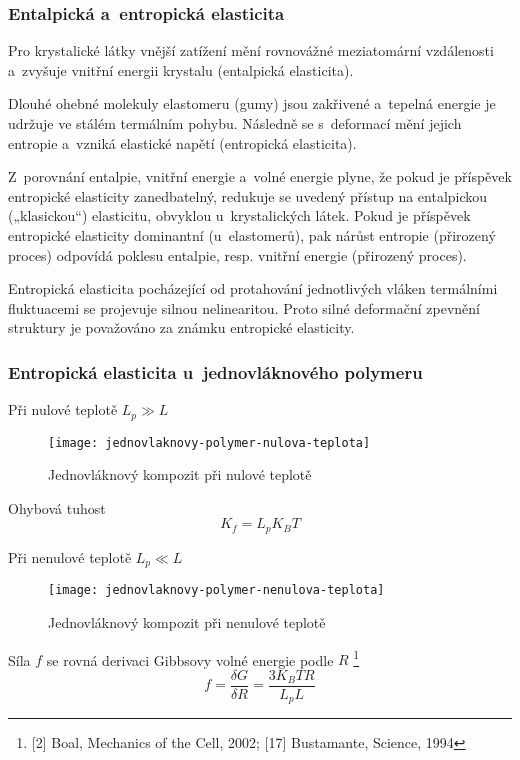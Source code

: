 \subsubsection{Entalpická a~entropická elasticita}
Pro krystalické látky vnější zatížení mění rovnovážné meziatomární vzdálenosti a~zvyšuje vnitřní energii krystalu (entalpická elasticita).

Dlouhé ohebné molekuly elastomeru (gumy) jsou zakřivené a~tepelná energie je udržuje ve stálém termálním pohybu. Následně se s~deformací mění jejich entropie a~vzniká elastické napětí (entropická elasticita).

Z~porovnání entalpie, vnitřní energie a~volné energie plyne, že pokud je příspěvek entropické elasticity zanedbatelný, redukuje se uvedený přístup na entalpickou („klasickou“) elasticitu, obvyklou u~krystalických látek.
Pokud je příspěvek entropické elasticity dominantní (u~elastomerů), pak nárůst entropie (přirozený proces) odpovídá poklesu entalpie, resp. vnitřní energie (přirozený proces).

Entropická elasticita pocházející od protahování jednotlivých vláken termálními fluktuacemi se projevuje silnou nelinearitou.
Proto silné deformační zpevnění struktury je považováno za známku entropické elasticity.

\subsubsection{Entropická elasticita u~jednovláknového polymeru}
Při nulové teplotě $L_p \gg L$
\begin{figure}[H]
	\centering
	\texttt{[image: jednovlaknovy-polymer-nulova-teplota]}
	\caption{Jednovláknový kompozit při nulové teplotě}
	\label{fig:jednovlaknovy-polymer-nulova-teplota}
\end{figure}
Ohybová tuhost
\begin{equation}
	K_f = L_p K_B T
\end{equation}

Při nenulové teplotě $L_p \ll L$
\begin{figure}[H]
	\centering
	\texttt{[image: jednovlaknovy-polymer-nenulova-teplota]}
	\caption{Jednovláknový kompozit při nenulové teplotě}
	\label{fig:jednovlaknovy-polymer-nenulova-teplota}
\end{figure}

Síla $f$ se rovná derivaci Gibbsovy volné energie podle $R$
\footnote{[2] Boal, Mechanics of the Cell, 2002; [17] Bustamante, Science, 1994}
\begin{equation}
	f = \frac{\delta G}{\delta R} = \frac{3 K_B T R}{L_p L}
\end{equation}

